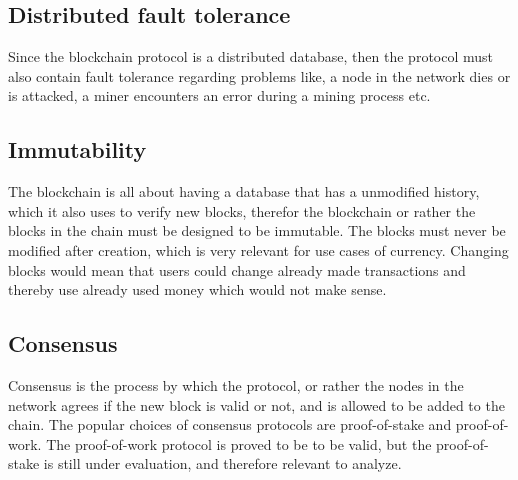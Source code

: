 
\subsection{Distributed fault tolerance}
Since the blockchain protocol is a distributed database, then the protocol must also contain fault tolerance regarding problems like, a node in the network dies or is attacked, a miner encounters an error during a mining process etc.

\subsection{Immutability}
The blockchain is all about having a database that has a unmodified history, which it also uses to verify new blocks, therefor the blockchain or rather the blocks in the chain must be designed to be immutable. The blocks must never be modified after creation, which is very relevant for use cases of currency. Changing blocks would mean that users could change already made transactions and thereby use already used money which would not make sense.

\subsection{Consensus}
Consensus is the process by which the protocol, or rather the nodes in the network agrees if the new block is valid or not, and is allowed to be added to the chain. The popular choices of consensus protocols are proof-of-stake and proof-of-work. The proof-of-work protocol is proved to be to be valid, but the proof-of-stake is still under evaluation, and therefore relevant to analyze.\cite{web:consensus}

